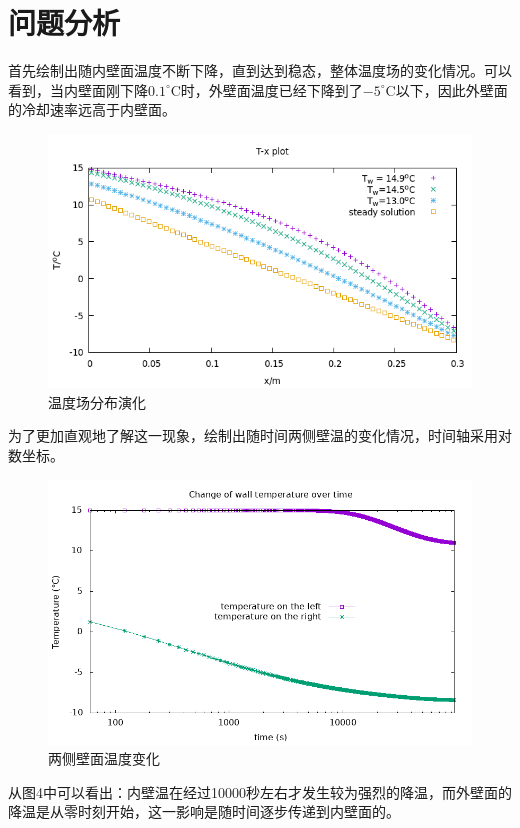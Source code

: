 \documentclass[10pt]{scrartcl}
\begin{document}
\section{问题分析}
首先绘制出随内壁面温度不断下降，直到达到稳态，整体温度场的变化情况。可以看到，当内壁面刚下降$0.1^\circ$C时，外壁面温度已经下降到了$-5^\circ$C以下，因此外壁面的冷却速率远高于内壁面。
\begin{figure}[H]
	\centering
	\includegraphics[width=0.7\linewidth]{multi_condition}
	\caption{温度场分布演化}
	\label{fig:multicondition}
\end{figure}
为了更加直观地了解这一现象，绘制出随时间两侧壁温的变化情况，时间轴采用对数坐标。
\begin{figure}[H]
	\centering
	\includegraphics[width=0.7\linewidth]{t}
	\caption{两侧壁面温度变化}
	\label{fig:t}
\end{figure}
从图4中可以看出：内壁温在经过10000秒左右才发生较为强烈的降温，而外壁面的降温是从零时刻开始，这一影响是随时间逐步传递到内壁面的。
\end{document}
